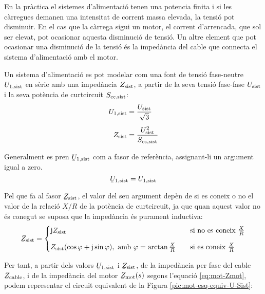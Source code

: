 En la pràctica el sistemes d'alimentació tenen una potencia finita i si les càrregues demanen una intensitat de corrent massa elevada, la tensió pot disminuir. En el cas que la càrrega sigui un motor, el corrent d'arrencada, que sol ser elevat, pot ocasionar aquesta disminució de tensió. Un altre element que pot ocasionar una disminució de la tensió és la impedància del cable que connecta el sistema d'alimentació amb el motor.

Un sistema d'alimentació es pot modelar com una font de tensió fase-neutre $U_\mathrm{1,sist}$ en sèrie amb una impedància $Z_\mathrm{sist}$, a partir de la seva tensió fase-fase $U_\mathrm{sist}$ i la seva potència de curtcircuit $S_\mathrm{cc,sist}$:
\begin{align}
	U_\mathrm{1,sist} &= \frac{U_\mathrm{sist}}{\sqrt{3}} \\[1ex]
	Z_\mathrm{sist} &= \frac{U_\mathrm{sist}^2}{S_\mathrm{cc,sist}}
\end{align}

Generalment es pren $\cmplx{U}\ped{1,sist}$ com a fasor de referència, assignant-li un argument igual a zero. 
\begin{equation}
	\cmplx{U}\ped{1,sist} = U\ped{1,sist}
\end{equation}

Pel que fa al fasor  $\cmplx{Z}\ped{sist}$, el valor del seu argument depèn de si es coneix o no el valor de la relació $X/R$ de la potència de curtcircuit, ja que quan aquest valor no és conegut se suposa que la impedància és purament inductiva:
\begin{equation}
	\cmplx{Z}\ped{sist} = 
	\begin{cases}
		\ju Z\ped{sist}  & \quad\text{si no es coneix }\frac{X}{R}  \\[2ex]
		Z\ped{sist} (\cos\varphi+\ju\sin\varphi), \text{ amb } \varphi=\arctan\frac{X}{R}& \quad\text{si es coneix } \frac{X}{R} 
	\end{cases}
\end{equation}

Per tant, a partir dels valors $\cmplx{U}\ped{1,sist}$ i $\cmplx{Z}\ped{sist}$, de la impedància per fase del cable $\cmplx{Z}\ped{cable}$, i de la impedància del motor $\cmplx{Z}\ped{mot}(s)$ segons l'equació \eqref{eq:mot-Zmot}, podem representar el circuit equivalent de la Figura \vref{pic:mot-esq-equiv-U-Sist}:
\begin{center}
	
	\label{pic:mot-esq-equiv-U-Sist}
\end{center}

